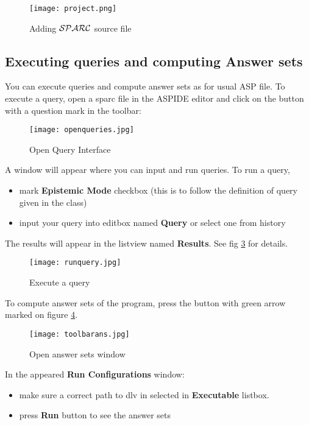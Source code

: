 \documentclass[12pt, letterpaper]{article}
\begin{document}
\begin{figure}[ht]
\centering
\texttt{[image: project.png]}
\caption{Adding  ${\cal SPARC}$ source file }
\label{fig:createfile}
\end{figure}
  
\subsection{Executing queries and computing Answer sets} 
You can execute queries and compute answer sets as for usual ASP file.
To execute a query, open a sparc file in the ASPIDE editor and click on the button with a question mark in the toolbar:
\begin{figure}[ht]
\centering
\texttt{[image: openqueries.jpg]}
\caption{Open Query Interface}
\label{fig:openqueries}
\end{figure}

A window will appear where you can input and run queries.
To run a query, 
\begin{itemize}
\item mark \textbf{Epistemic Mode} checkbox (this is to follow the definition of query given in the class)
\item input your query into editbox named \textbf{Query} or select one from history
\end{itemize}
The results will appear in the listview named \textbf{Results}.
See fig \ref{fig:runquery} for details.
\pagebreak
\begin{figure}[ht]
\centering
\texttt{[image: runquery.jpg]}
\caption{Execute a query}
\label{fig:runquery}
\end{figure}
\pagebreak

To compute answer sets of the program, press the button with green arrow marked on figure \ref{fig:ansshow}.

\begin{figure}[ht]
\centering
\texttt{[image: toolbarans.jpg]}
\caption{Open answer sets window}
\label{fig:ansshow}
\end{figure}

In the appeared \textbf{Run Configurations} window: 
\begin{itemize}
\item make sure a correct path to dlv in selected in \textbf{Executable} listbox. 
\item press \textbf{Run} button to see the answer sets
\end{itemize}
\end{document}

